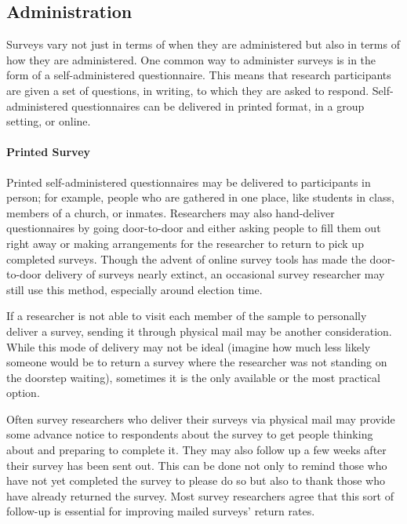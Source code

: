 \subsection{Administration}

Surveys vary not just in terms of when they are administered but also in terms of how they are administered. One common way to administer surveys is in the form of a self-administered \gls{questionnaire}. This means that research participants are given a set of questions, in writing, to which they are asked to respond. Self-administered questionnaires can be delivered in printed format, in a group setting, or online.

\paragraph{Printed Survey}

Printed self-administered questionnaires may be delivered to participants in person; for example, people who are gathered in one place, like students in class, members of a church, or inmates. Researchers may also hand-deliver questionnaires by going door-to-door and either asking people to fill them out right away or making arrangements for the researcher to return to pick up completed surveys. Though the advent of online survey tools has made the door-to-door delivery of surveys nearly extinct, an occasional survey researcher may still use this method, especially around election time.

If a researcher is not able to visit each member of the sample to personally deliver a survey, sending it through physical mail may be another consideration. While this mode of delivery may not be ideal (imagine how much less likely someone would be to return a survey where the researcher was not standing on the doorstep waiting), sometimes it is the only available or the most practical option.

Often survey researchers who deliver their surveys via physical mail may provide some advance notice to respondents about the survey to get people thinking about and preparing to complete it. They may also follow up a few weeks after their survey has been sent out. This can be done not only to remind those who have not yet completed the survey to please do so but also to thank those who have already returned the survey. Most survey researchers agree that this sort of follow-up is essential for improving mailed surveys' return rates\cite{babbie2010unobtrusive}.

